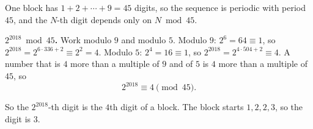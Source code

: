 One block has $1+2+\cdots+9=45$ digits, so the sequence is periodic with period $45$, and the $N$-th digit depends only on $N\bmod45$.

\textbf{$2^{2018}\bmod45$.} Work modulo $9$ and modulo $5$. Modulo $9$: $2^6=64\equiv1$, so $2^{2018}=2^{6\cdot336+2}\equiv2^2=4$. Modulo $5$: $2^4=16\equiv1$, so $2^{2018}=2^{4\cdot504+2}\equiv4$. A number that is $4$ more than a multiple of $9$ and of $5$ is $4$ more than a multiple of $45$, so
\[
2^{2018}\equiv4\pmod{45}.
\]

So the $2^{2018}$-th digit is the $4$th digit of a block. The block starts $1,2,2,3$, so the digit is $\boxed{3}$.
